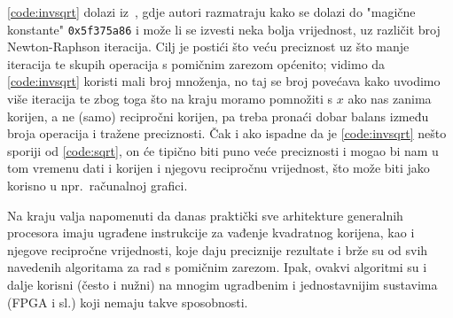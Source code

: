 \documentclass[12pt]{scrartcl}
\begin{document}
\autoref{code:invsqrt} dolazi iz~\cite{walczyk2018improving}, gdje autori razmatraju kako se dolazi do "magične konstante"
\verb|0x5f375a86| i može li se izvesti neka bolja vrijednost, uz različit broj Newton-Raphson iteracija. Cilj je postići što
veću preciznost uz što manje iteracija te skupih operacija s pomičnim zarezom općenito; vidimo da \autoref{code:invsqrt} koristi mali
broj množenja, no taj se broj povećava kako uvodimo više iteracija te zbog toga što na kraju moramo pomnožiti s $x$ ako nas zanima korijen, a ne
(samo) recipročni korijen, pa treba pronaći dobar balans između broja operacija i tražene preciznosti. Čak i ako ispadne da je \autoref{code:invsqrt}
nešto sporiji od \autoref{code:sqrt}, on će tipično biti puno veće preciznosti i mogao bi nam u tom vremenu dati i korijen i njegovu recipročnu vrijednost,
što može biti jako korisno u npr.\ računalnoj grafici.

Na kraju valja napomenuti da danas praktički sve arhitekture generalnih procesora imaju ugrađene instrukcije za vađenje kvadratnog korijena, kao
i njegove recipročne vrijednosti, koje daju preciznije rezultate i brže su od svih navedenih algoritama za rad s pomičnim zarezom. Ipak, ovakvi
algoritmi su i dalje korisni (često i nužni) na mnogim ugradbenim i jednostavnijim sustavima (FPGA i sl.) koji nemaju takve sposobnosti.
\end{document}
